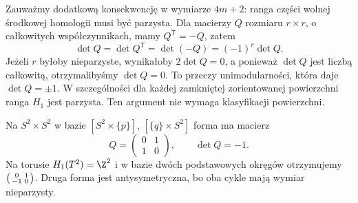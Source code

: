 Zauważmy dodatkową konsekwencję w wymiarze $4m+2$:
ranga części wolnej środkowej homologii musi być
parzysta. Dla macierzy $Q$ rozmiaru $r\times r$,
o całkowitych współczynnikach, mamy
$Q^{\mathsf T}=-Q$, zatem
\[
 \det Q=\det Q^{\mathsf T}
       =\det(-Q)=(-1)^r\det Q.
\]
Jeżeli $r$ byłoby nieparzyste, wynikałoby
$2\det Q=0$, a ponieważ $\det Q$ jest liczbą
całkowitą, otrzymalibyśmy $\det Q=0$.
To przeczy unimodularności, która daje
$\det Q=\pm1$. W szczególności dla każdej
zamkniętej zorientowanej powierzchni
ranga $H_1$ jest parzysta.
Ten argument nie wymaga klasyfikacji powierzchni.

\begin{przyklad}
Na $S^2\times S^2$
w bazie
$[S^2\times\{p\}]$,
$[\{q\}\times S^2]$
forma ma macierz
\[
 Q=
 \begin{pmatrix}
  0&1\\1&0
 \end{pmatrix},
 \qquad\det Q=-1.
\]
Na torusie
$H_1(T^2)=\Z^2$
i w bazie dwóch
podstawowych okręgów
otrzymujemy
$\begin{psmallmatrix}
0&1\\-1&0
\end{psmallmatrix}$.
Druga forma jest
antysymetryczna,
bo oba cykle mają
wymiar nieparzysty.
\end{przyklad}

